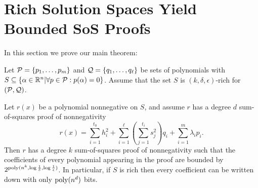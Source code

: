 \section{Rich Solution Spaces Yield Bounded SoS Proofs}
\label{sec:main}

In this section we prove our main theorem:

\begin{theorem}\label{thm:main}
Let $\mathcal P = \{p_1,\dots,p_m\}$ and $\mathcal Q = \{q_1, \dots, q_\ell\}$ be sets of polynomials with $S \subseteq \{\alpha \in \mathbb R^n | \forall p \in \mathcal P: p(\alpha) = 0\}$. Assume that the set $S$ is $(k,\delta,\epsilon)$-rich for $(\mathcal P,\mathcal Q)$.

Let $r(x)$ be a polynomial nonnegative on $S$, and assume $r$ has a degree $d$ sum-of-squares proof of nonnegativity 
\[r(x) = \sum_{i=1}^{t_0} h_i^2 + \sum_{i=1}^\ell \left(\sum_{j=1}^{t_i} s_j^2\right) q_i + \sum_{i=1}^m \lambda_i p_i.\] 
Then $r$ has a degree $k$ sum-of-squares proof of nonnegativity such that the coefficients of every polynomial appearing in the proof are bounded by $2^{\operatorname{poly}(n^k,\log \frac{1}{\delta},\log \frac{1}{\epsilon})}$. In particular, if $S$ is rich then every coefficient can be written down with only $\operatorname{poly}(n^d)$ bits. 
\end{theorem}
